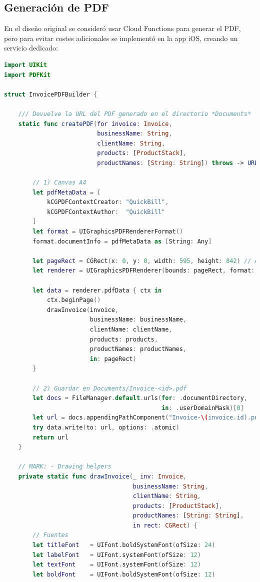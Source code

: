 \subsection{Generación de PDF}

\begin{large}

En el diseño original se consideró usar Cloud Functions para generar el PDF, pero para evitar costes adicionales se implementó en la app iOS, creando un servicio dedicado:

\begin{lstlisting}[language={swift}, caption={Servicio para generar PDF de facturas}]
import UIKit
import PDFKit

struct InvoicePDFBuilder {
    
    /// Devuelve la URL del PDF generado en el directorio *Documents*
    static func createPDF(for invoice: Invoice,
                          businessName: String,
                          clientName: String,
                          products: [ProductStack],
                          productNames: [String: String]) throws -> URL {
        
        // 1) Canvas A4
        let pdfMetaData = [
            kCGPDFContextCreator: "QuickBill",
            kCGPDFContextAuthor:  "QuickBill"
        ]
        let format = UIGraphicsPDFRendererFormat()
        format.documentInfo = pdfMetaData as [String: Any]
        
        let pageRect = CGRect(x: 0, y: 0, width: 595, height: 842) // A4 @72 dpi
        let renderer = UIGraphicsPDFRenderer(bounds: pageRect, format: format)
        
        let data = renderer.pdfData { ctx in
            ctx.beginPage()
            drawInvoice(invoice,
                        businessName: businessName,
                        clientName: clientName,
                        products: products,
                        productNames: productNames,
                        in: pageRect)
        }
        
        // 2) Guardar en Documents/Invoice-<id>.pdf
        let docs = FileManager.default.urls(for: .documentDirectory,
                                            in: .userDomainMask)[0]
        let url = docs.appendingPathComponent("Invoice-\(invoice.id).pdf")
        try data.write(to: url, options: .atomic)
        return url
    }
    
    // MARK: - Drawing helpers
    private static func drawInvoice(_ inv: Invoice,
                                    businessName: String,
                                    clientName: String,
                                    products: [ProductStack],
                                    productNames: [String: String],
                                    in rect: CGRect) {
        // Fuentes
        let titleFont   = UIFont.boldSystemFont(ofSize: 24)
        let labelFont   = UIFont.systemFont(ofSize: 12)
        let textFont    = UIFont.systemFont(ofSize: 12)
        let boldFont    = UIFont.boldSystemFont(ofSize: 12)
        

\end{lstlisting}
\end{large}

